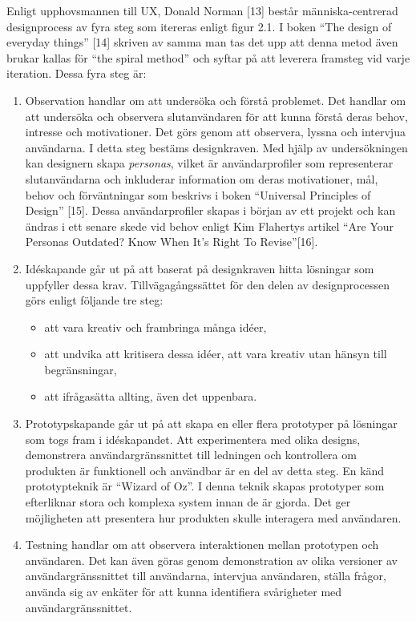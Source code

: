 \documentclass[12pt]{kththesis}
\begin{document}
Enligt upphovsmannen till UX, Donald Norman [13] består människa-centrerad designprocess av fyra steg som itereras enligt figur 2.1. I boken “The design of everyday things” [14] skriven av samma man tas det upp att denna metod även brukar kallas för “the spiral method” och syftar på att leverera framsteg vid varje iteration. Dessa fyra steg är:  

\begin{enumerate}
\item Observation handlar om att undersöka och förstå problemet. Det handlar om att undersöka och observera slutanvändaren för att kunna förstå deras behov, intresse och motivationer. Det görs genom att observera, lyssna och intervjua användarna. I detta steg bestäms designkraven. Med hjälp av undersökningen kan designern skapa \textit{personas}, vilket är användarprofiler som representerar slutanvändarna och inkluderar information om deras motivationer, mål, behov och förväntningar som beskrivs i boken “Universal Principles of Design” [15]. Dessa användarprofiler skapas i början av ett projekt och kan ändras i ett senare skede vid behov enligt Kim Flahertys artikel “Are Your Personas Outdated? Know When It’s Right To Revise”[16].

\item Idéskapande går ut på att baserat på designkraven hitta lösningar som uppfyller dessa krav. Tillvägagångssättet för den delen av designprocessen görs enligt följande tre steg:
\begin{itemize}
\item att vara kreativ och frambringa många idéer,
\item att undvika att kritisera dessa idéer, att vara kreativ utan hänsyn till begränsningar,
\item att ifrågasätta allting, även det uppenbara. 
\end{itemize}

\item Prototypskapande går ut på att skapa en eller flera prototyper på lösningar som togs fram i idéskapandet. Att experimentera med olika designs, demonstrera användargränssnittet till ledningen och kontrollera om produkten är funktionell och användbar är en del av detta steg. En känd prototypteknik är “Wizard of Oz”. I denna teknik skapas prototyper som efterliknar stora och komplexa system innan de är gjorda. Det ger möjligheten att presentera hur produkten skulle interagera med användaren. 

\item Testning handlar om att observera interaktionen mellan prototypen och användaren. Det kan även göras genom demonstration av olika versioner av användargränssnittet till användarna, intervjua användaren, ställa frågor, använda sig av enkäter för att kunna identifiera svårigheter med användargränssnittet. 
 
\end{enumerate}
\end{document}

